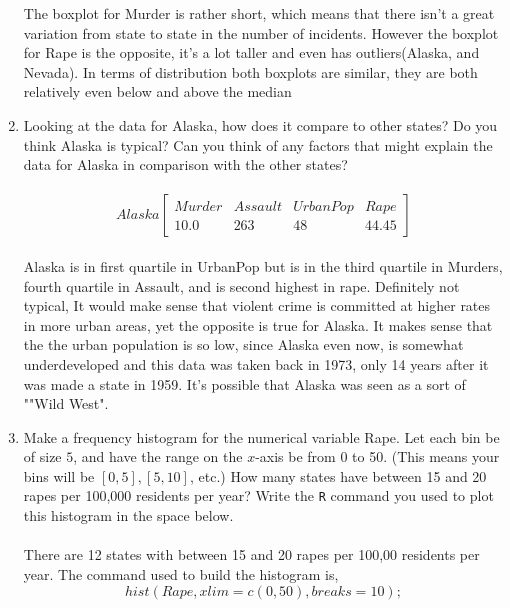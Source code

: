 \documentclass{report}
\begin{document}
\begin{enumerate}
The boxplot for Murder is rather short, which means that there isn't a great variation from state to state in the number of incidents. However the boxplot for Rape is the opposite, it's a lot taller and even has outliers(Alaska, and Nevada). In terms of distribution both boxplots are similar, they are both relatively even below and above the median


\item Looking at the data for Alaska, how does it compare to other states?
Do you think Alaska is typical?  Can you think of any factors that
might explain the data for Alaska in comparison with the other
states?\\\\
\begin{equation}
Alaska
\begin{bmatrix}
Murder&Assault&UrbanPop&Rape\\ 
 10.0&263&48&44.45
\end{bmatrix}
\end{equation}
\\
Alaska is in first quartile in UrbanPop but is in the third quartile in Murders, fourth quartile in Assault, and is second highest in rape. Definitely not typical, It would make sense that violent crime is committed at higher rates in more urban areas, yet the opposite is true for Alaska. It makes sense that the the urban population is so low, since Alaska even now, is somewhat underdeveloped and this data was taken back in 1973, only 14 years after it was made a state in 1959. It's possible that Alaska was seen as a sort of ""Wild West".


\item Make a frequency histogram for the numerical variable Rape.  Let each
bin be of size $5$, and have the range on the $x$-axis be from 0 to
50.  (This means your bins will be $[0,5], [5,10]$, etc.)  How many
states have between 15 and 20 rapes per 100,000 residents per year?
Write the {\tt R} command you used to plot this histogram in the space
below.\\\\

There are 12 states with between 15 and 20 rapes per 100,00 residents per year. The command used to build the histogram is,
\begin{equation}
 hist(Rape, xlim=c(0,50), breaks=10); 
\end{equation}


\end{enumerate}
\end{document}
